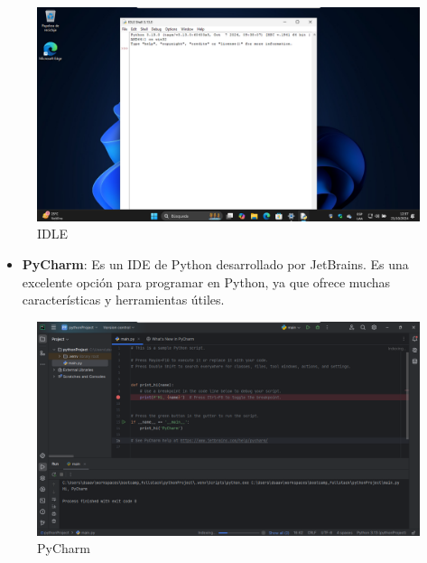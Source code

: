 \documentclass[
  a4paper,
  DIV=11,
  numbers=noendperiod,
  onepage,
  openany]{scrreprt}
\providecommand{\tightlist}{%
  \setlength{\itemsep}{0pt}\setlength{\parskip}{0pt}}\usepackage{longtable,booktabs,array}
\begin{document}
\begin{figure}[H]

{\centering \includegraphics{unidades/unidad1/images/idle_python.png}

}

\caption{IDLE}

\end{figure}%

\begin{itemize}
\tightlist
\item
  \textbf{PyCharm}: Es un IDE de Python desarrollado por JetBrains. Es
  una excelente opción para programar en Python, ya que ofrece muchas
  características y herramientas útiles.
\end{itemize}

\begin{figure}[H]

{\centering \includegraphics{unidades/unidad1/images/pycharm.png}

}

\caption{PyCharm}

\end{figure}%
\end{document}
